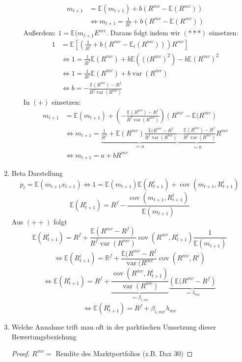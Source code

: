 \documentclass[12pt]{extreport} %
\newcommand{\R}{\mathbb{R}}
\theoremstyle{named}
\theoremstyle{nnamed}
\theoremstyle{itshape}
\theoremstyle{normal}
\begin{document}
\begin{enumerate}
\begin{itemize}
				\begin{align*}
					m_{t+1} & = \mathbb{E}(m_{t+1}) + b \left( R^{mv} - \mathbb{E}(R^{mv}) \right) \tag*{$(+)$} \\
						& \iff m_{t+1} = \frac{1}{R^f} + b \left( R^{mv} - \mathbb{E}(R^{mv}) \right)  \tag*{$(***)$}
				\end{align*}
				Außerdem: $1 = \mathbb{E}(m_{t+1} E^{mv}$. Daraus folgt indem wir $(***)$ einsetzen:
					\begin{align*}
						1 & = \mathbb{E} \left[ \left( \frac{1}{R^f} + b \left( R^{mv} - \mathbb{E}_t \left( R^{mv} \right) \right) \right) R^{mv} \right] \\
						& \iff 1 = \frac{1}{R^f} \mathbb{E}(R^{mv}) + b \mathbb{E}\left( \left((R^{mv} \right)^2 \right) - b \mathbb{E} \left(R^{mv} \right)^2 \\
						& \iff 1 = \frac{1}{R^f} \mathbb{E}(R^{mv}) + b \operatorname{var}(R^{mv}) \\
						& \iff b = - \frac{\mathbb{E}(R^{mv}) - R^f}{R^f \operatorname{var}(R^{mv})}
					\end{align*} 
					In $(+)$ einsetzen:
					\begin{align*}
						m_{t+1} & = \mathbb{E}(m_{t+1}) + \left( - \frac{\mathbb{E}(R^{mv}) - R^f}{R^f \operatorname{var}(R^{mv})} \right) \left( R^{mv} - \mathbb{E}(R^{mv} \right) \\
						& \iff m_{t+1} = \underbrace{\frac{1}{R^f} + \mathbb{E}(R^{mv}) \frac{\mathbb{E}(R^{mv} - R^f}{R^f \operatorname{var}(R^{mv})}}_{\eqqcolon a} \underbrace{- \frac{\mathbb{E}(R^{mv}) - R^f}{R^f \operatorname{var}(R^{mv})}}_{\eqqcolon b} R^{mv} \tag*{$(++)$} \\
						& \iff m_{t+1} = a + b R^{mv}
					\end{align*} 
		\end{itemize}
		\item Beta Darstellung
			$$ p_{t} = \mathbb{E}(m_{t+1} x_{t+1}) \iff 1 = \mathbb{E}(m_{t+1}) \mathbb{E}(R^i_{t+1}) + \operatorname{cov}(m_{t+1}, R^i_{t+1}) $$
			$$ \mathbb{E}(R_{t+1}^i) = R^f - \frac{\operatorname{cov}(m_{t+1}, R_{t+1}^i)}{\mathbb{E}(m_{t+1})} $$
			Aus $(++)$ folgt
			$$ \mathbb{E}(R_{t+1}^i) = R^f + \frac{\mathbb{E}(R^{mv} - R^f)}{R^f \operatorname{var}(R^{mv})} \operatorname{cov}(R^{mv}, R_{t+1}^i) \frac{1}{\mathbb{E}(m_{t+1})} $$
			$$ \iff \mathbb{E}(R_{t+1}^i) = \R^f + \frac{\mathbb{E}(R^{mv} - R^f}{\operatorname{var}(R^{mv}} \operatorname{cov}(R^{mv}, R^i) $$
			$$ \iff \mathbb{E}(R^i_{t+1}) = R^{f} + \underbrace{\frac{\operatorname{cov}(R^{mv}, R^{i}_{t+1})}{\operatorname{var}(R^{mv})}}_{\eqqcolon \beta_{i, mv}} \underbrace{\left( \mathbb{E}(R^{mv} - R^f \right)}_{\eqqcolon \lambda_{mv}} $$
			$$ \iff \mathbb{E}(R^i_{t+1}) = R^f + \beta_{i, mv} \lambda_{mv} $$
		\item Welche Annahme trift man oft in der parktischen Umsetzung dieser Bewertungsbeziehung
			\begin{proof}
				$R^{mv} =$ Rendite des Marktportfolios (z.B. Dax 30)
			\end{proof}
\end{enumerate}
\end{document}
